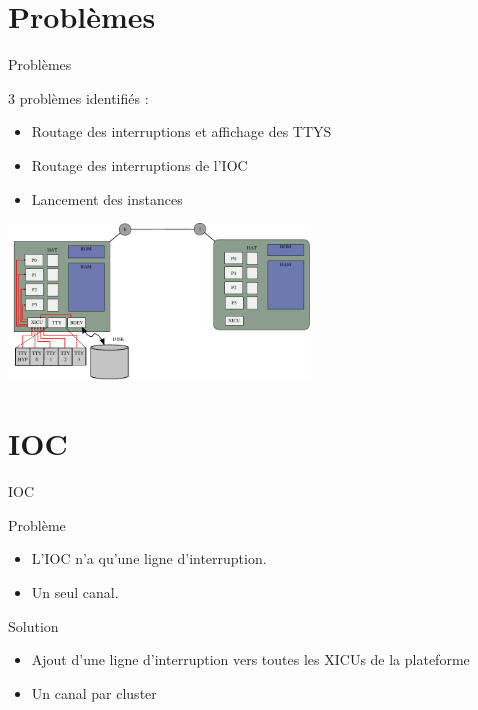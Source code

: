 \documentclass[12pt,francais]{beamer}
\begin{document}
\section*{Problèmes}

\begin{frame}{Problèmes}
        \begin{center}
                3 problèmes identifiés :
                \begin{itemize}
                        \item Routage des interruptions et affichage des TTYS
                        \item Routage des interruptions de l'IOC
                        \item Lancement des instances
                \end{itemize}
                \includegraphics[width=8cm]{platform.pdf}
        \end{center}
\end{frame}

\section*{IOC}
\begin{frame}{IOC}
        \begin{center}
                \begin{block}{Problème}
                        \begin{itemize}
                                \item L'IOC n'a qu'une ligne d'interruption.
                                \item Un seul canal.
                        \end{itemize}
                \end{block}
                \pause
                \begin{block}{Solution}
                        \begin{itemize}
                                \item Ajout d'une ligne d'interruption vers toutes les XICUs de la plateforme
                                \item Un canal par cluster
                        \end{itemize}
                \end{block}
        \end{center}
\end{frame}
\end{document}
